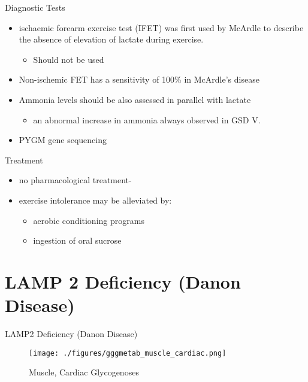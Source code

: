 \documentclass[presentation, smaller]{beamer}
\begin{document}
\begin{frame}[label={sec:org2e38acb}]{Diagnostic Tests}
\begin{itemize}
\item ischaemic forearm exercise test (IFET) was first used by McArdle to
describe the absence of elevation of lactate during exercise.
\begin{itemize}
\item \alert{Should not be used}
\end{itemize}

\item Non-ischemic FET has a sensitivity of 100\% in McArdle’s disease
\item Ammonia levels should be also assessed in parallel with lactate
\begin{itemize}
\item an abnormal increase in ammonia always observed in GSD V.
\end{itemize}
\item PYGM gene sequencing
\end{itemize}
\end{frame}

\begin{frame}[label={sec:org635e170}]{Treatment}
\begin{itemize}
\item no pharmacological treatment-
\item exercise intolerance may be alleviated by:
\begin{itemize}
\item aerobic conditioning programs
\item ingestion of oral sucrose
\end{itemize}
\end{itemize}
\end{frame}
\section{LAMP 2 Deficiency (Danon Disease)}
\label{sec:org393c284}
\begin{frame}[label={sec:orgf8278c6}]{LAMP2 Deficiency (Danon Disease)}
\begin{figure}[htbp]
\centering
\texttt{[image: ./figures/gggmetab\_muscle\_cardiac.png]}
\caption[Muscle, Cardiac Glycogenoses]{\label{fig:org6b206ca}
Muscle, Cardiac Glycogenoses}
\end{figure}
\end{frame}
\end{document}
